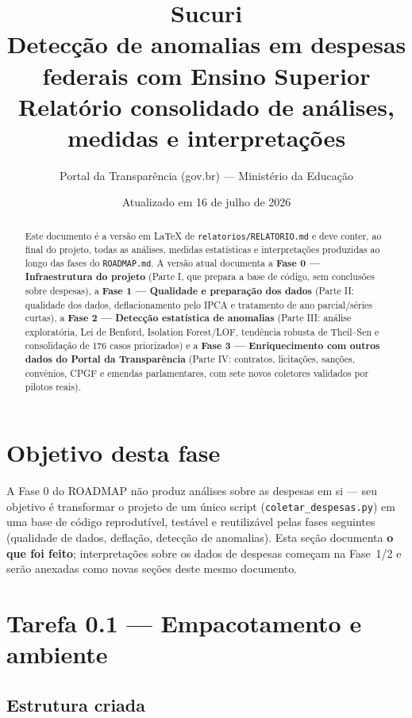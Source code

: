 \documentclass[11pt,a4paper]{article}
\title{\textbf{Sucuri}\\[0.3em]
\large Detecção de anomalias em despesas federais com Ensino Superior\\
\large Relatório consolidado de análises, medidas e interpretações}
\author{Portal da Transparência (gov.br) --- Ministério da Educação}
\date{Atualizado em 16 de julho de 2026}
\begin{document}
\maketitle

\begin{abstract}
\noindent Este documento é a versão em \LaTeX{} de \texttt{relatorios/RELATORIO.md}
e deve conter, ao final do projeto, todas as análises, medidas estatísticas e
interpretações produzidas ao longo das fases do \texttt{ROADMAP.md}. A versão
atual documenta a \textbf{Fase 0 --- Infraestrutura do projeto} (Parte I,
que prepara a base de código, sem conclusões sobre despesas), a
\textbf{Fase 1 --- Qualidade e preparação dos dados} (Parte II: qualidade
dos dados, deflacionamento pelo IPCA e tratamento de ano parcial/séries
curtas), a \textbf{Fase 2 --- Detecção estatística de anomalias} (Parte
III: análise exploratória, Lei de Benford, Isolation Forest/LOF, tendência
robusta de Theil--Sen e consolidação de 176 casos priorizados) e a
\textbf{Fase 3 --- Enriquecimento com outros dados do Portal da
Transparência} (Parte IV: contratos, licitações, sanções, convênios,
CPGF e emendas parlamentares, com sete novos coletores validados por
pilotos reais).
\end{abstract}

\tableofcontents
\vspace{1em}

\section{Objetivo desta fase}

A Fase 0 do ROADMAP não produz análises sobre as despesas em si --- seu
objetivo é transformar o projeto de um único script
(\texttt{coletar\_despesas.py}) em uma base de código reprodutível, testável
e reutilizável pelas fases seguintes (qualidade de dados, deflação, detecção
de anomalias). Esta seção documenta \textbf{o que foi feito}; interpretações
sobre os dados de despesas começam na Fase~1/2 e serão anexadas como novas
seções deste mesmo documento.

\section{Tarefa 0.1 --- Empacotamento e ambiente}

\subsection{Estrutura criada}
\end{document}
